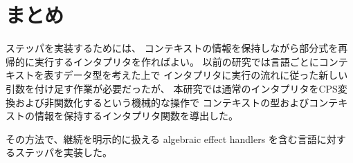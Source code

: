 \section{まとめ}
\label{section:conclusion}

ステッパを実装するためには、
コンテキストの情報を保持しながら部分式を再帰的に実行するインタプリタを作ればよい。
以前の研究\cite{FCA19}では言語ごとにコンテキストを表すデータ型を考えた上で
インタプリタに実行の流れに従った新しい引数を付け足す作業が必要だったが、
本研究では通常のインタプリタをCPS変換および非関数化するという機械的な操作で
コンテキストの型およびコンテキストの情報を保持するインタプリタ関数を導出した。

その方法で、継続を明示的に扱える algebraic effect handlers を含む言語に対するステッパを実装した。
